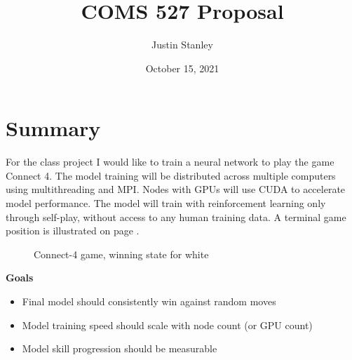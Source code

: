\documentclass{article}
\title{COMS 527 Proposal}
\author{Justin Stanley}
\date{October 15, 2021}
\begin{document}
\maketitle

\section{Summary}

For the class project I would like to train a neural network to play the game Connect 4. The model training will be distributed across multiple computers using multithreading and MPI. Nodes with GPUs will use CUDA to accelerate model performance. The model will train with reinforcement learning only through self-play, without access to any human training data. A terminal game position is illustrated on page \pageref{fig:c4}.

\begin{figure}
    \centering
    \caption{Connect-4 game, winning state for white}
    \label{fig:c4}
\end{figure}

\vspace{0.5cm}

\noindent\textbf{Goals}
\begin{itemize}
    \item Final model should consistently win against random moves
    \item Model training speed should scale with node count (or GPU count)
    \item Model skill progression should be measurable
\end{itemize}
\end{document}
